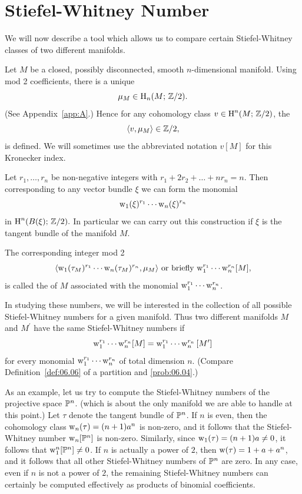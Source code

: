 \documentclass[../main]{subfiles}
\begin{document}
\section{Stiefel-Whitney Number}\label{sec:4.4}

We will now describe a tool which allows us to compare certain Stiefel-Whitney classes of two different manifolds.

Let $M$ be a closed, possibly disconnected, smooth $n$-dimensional manifold. Using mod 2 coefficients, there is a unique 
\[
\mu_{M} \in \operatorname{H}_{n}(M ; \, \mathbb{Z} / 2).
\]
(See Appendix~\ref{app:A}.) Hence for any cohomology class $v \in \operatorname{H}^{n}(M ; \, \mathbb{Z} / 2)$, the 
\[
\langle v,\mu_{M}\rangle \in \mathbb{Z} / 2,
\]
is defined. We will sometimes use the abbreviated notation $v[M]$ for this Kronecker index.

Let $r_{1}, \dots, r_{n}$ be non-negative integers with $r_{1}+2 r_{2}+\dots+n r_{n}=n$. Then corresponding to any vector bundle $\xi$ we can form the monomial
\[
\operatorname{w}_{1}(\xi)^{r_{1}} \cdots \operatorname{w}_{n}(\xi)^{r_{n}}
\]
in $\operatorname{H}^{n}(B(\xi) ;\, \mathbb{Z} / 2) .$ In particular we can carry out this construction if $\xi$ is the tangent bundle of the manifold $M$.

\begin{definition}
\label{def:04.02}
The corresponding integer mod 2
\[
\langle\operatorname{w}_{1}(\tau_{M})^{r_1} \cdots \operatorname{w}_{n}(\tau_{M})^{r_n}, \mu_{M}\rangle
\text{ or briefly }
{\operatorname{w}}_{1}^{r_1} \cdots \operatorname{w}_{n}^{r_n}[M],
\]
is called the  of $M$ associated with the monomial $\operatorname{w}_{1}^{r_{1}} \cdots \operatorname{w}_{n}^{r_n}$.
\end{definition}

In studying these numbers, we will be interested in the collection of all possible Stiefel-Whitney numbers for a given manifold. Thus two different manifolds $M$ and $M^{\prime}$ have the same Stiefel-Whitney numbers if 
\[
\operatorname{w}_{1}^{r_{1}} \cdots \operatorname{w}_{n}^{r_{n}} [M]=\operatorname{w}_{1}^{r_{1}} \cdots \operatorname{w}_{n} ^{r_n}{[M^{\prime}]}
\]
for every monomial ${\operatorname{w}}_{1}^{r_{1}} \cdots \operatorname{w}_{n}^{r_n}$ of total dimension $n$. (Compare Definition~\ref{def:06.06} of a partition and \ref{prob:06.04}.)

As an example, let us try to compute the Stiefel-Whitney numbers of the projective space $\mathbb{P}^{n}$. (which is about the only manifold we are able to handle at this point.) Let $\tau$ denote the tangent bundle of $\mathbb{P}^{n}$. If $n$ is even, then the cohomology class $\operatorname{w}_{n}(\tau)=(n+1) a^{n}$ is non-zero, and it follows that the Stiefel-Whitney number $\operatorname{w}_{n}[\mathbb{P}^{n}]$ is non-zero. Similarly, since $\operatorname{w}_{1}(\tau)=(n+1) a \neq 0$, it follows that $\operatorname{w}_{1}^{n}[\mathbb{P}^{n}] \neq 0$. If $n$ is actually a power of $2$, then $\operatorname{w}(\tau)=1+a+a^{n}$, and it follows that all other Stiefel-Whitney numbers of $\mathbb{P}^{n}$ are zero. In any case, even if $n$ is not a power of $2$, the remaining Stiefel-Whitney numbers can certainly be computed effectively as products of binomial coefficients.
\end{document}
